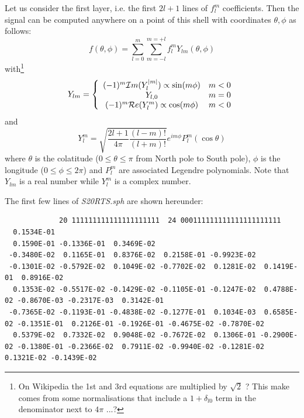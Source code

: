 Let us consider the first layer, i.e. the first $2l+1$ lines of 
$f_l^m$ coefficients. Then the signal can be computed 
anywhere on a point of this shell with coordinates $\theta,\phi$ as follows:
\[
f(\theta,\phi) = \sum_{l=0}^m \sum_{m=-l}^{m=+l} f_l^m Y_{lm}(\theta,\phi)
\]
with\footnote{On Wikipedia the 1st and 3rd equations are multiplied by $\sqrt{2}$ ? This make comes from 
some normalisations that include a $1+\delta_{l0}$ term in the denominator next to $4\pi$ ...?}
\begin{equation}
Y_{lm}
=
\left\{
\begin{array}{cc}
(-1)^m  {\cal I}m(Y_l^{|m|})  \propto \sin(m\phi) & m<0 \\
Y_{l,0} & m=0 \\
(-1)^m  {\cal R}e(Y_l^{m}) \propto \cos(m\phi)   & m<0 
\end{array}
\right.
\end{equation}
and
\begin{equation}
Y_l^m = \sqrt{\frac{2l+1}{4\pi}\frac{(l-m)!}{(l+m)!}} e^{im \phi} P_l^m (\cos\theta)
\label{f85:spheq}
\end{equation}
where 
$\theta$ is the colatitude ($0\le\theta\le \pi$ from North pole to South pole), $\phi$
is the longitude ($0\le\phi\le 2\pi$) and $P_l^m$ are associated Legendre polynomials.  Note that $Y_{lm}$ is a real number while $Y_l^m$ is a complex number.

The first few lines of {\sl S20RTS.sph} are shown hereunder:
\begin{tiny}
\begin{verbatim}
             20 111111111111111111111  24 000111111111111111111111 
  0.1534E-01
  0.1590E-01 -0.1336E-01  0.3469E-02
 -0.3480E-02  0.1165E-01  0.8376E-02  0.2158E-01 -0.9923E-02
 -0.1301E-02 -0.5792E-02  0.1049E-02 -0.7702E-02  0.1281E-02  0.1419E-01  0.8916E-02
  0.1353E-02 -0.5517E-02 -0.1429E-02 -0.1105E-01 -0.1247E-02  0.4788E-02 -0.8670E-03 -0.2317E-03  0.3142E-01
 -0.7365E-02 -0.1193E-01 -0.4838E-02 -0.1277E-01  0.1034E-03  0.6585E-02 -0.1351E-01  0.2126E-01 -0.1926E-01 -0.4675E-02 -0.7870E-02
  0.5379E-02  0.7332E-02  0.9048E-02 -0.7672E-02  0.1306E-01 -0.2900E-02 -0.1380E-01 -0.2366E-02  0.7911E-02 -0.9940E-02 -0.1281E-02  0.1321E-02 -0.1439E-02
\end{verbatim}
\end{tiny}

